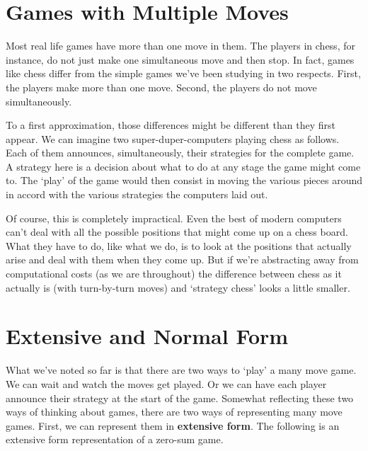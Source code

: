 \section{Games with Multiple Moves}
Most real life games have more than one move in them. The players in chess, for instance, do not just make one simultaneous move and then stop. In fact, games like chess differ from the simple games we've been studying in two respects. First, the players make more than one move. Second, the players do not move simultaneously.

To a first approximation, those differences might be different than they first appear. We can imagine two super-duper-computers playing chess as follows. Each of them announces, simultaneously, their strategies for the complete game. A strategy here is a decision about what to do at any stage the game might come to. The `play' of the game would then consist in moving the various pieces around in accord with the various strategies the computers laid out.

Of course, this is completely impractical. Even the best of modern computers can't deal with all the possible positions that might come up on a chess board. What they have to do, like what we do, is to look at the positions that actually arise and deal with them when they come up. But if we're abstracting away from computational costs (as we are throughout) the difference between chess as it actually is (with turn-by-turn moves) and `strategy chess' looks a little smaller.

\section{Extensive and Normal Form}
What we've noted so far is that there are two ways to `play' a many move game. We can wait and watch the moves get played. Or we can have each player announce their strategy at the start of the game. Somewhat reflecting these two ways of thinking about games, there are two ways of representing many move games. First, we can represent them in \textbf{extensive form}. The following is an extensive form representation of a zero-sum game. 

